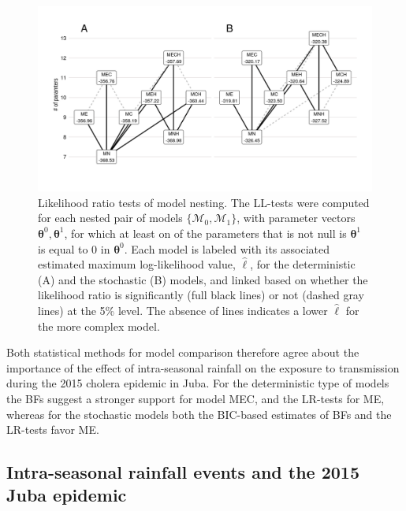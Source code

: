 \begin{figure}
    \centering
    \includegraphics[width = \textwidth, trim = 11mm 19mm 10mm 12mm, clip]{fig_cholera-rainfall/Lemaitre_ACTROP_2018_42_R1_fig3.png}
    \caption[Likelihood ratio tests of model nesting]{Likelihood ratio tests of model nesting. The LL-tests were computed for each nested pair of models $\{\mathcal{M}_0, \mathcal{M}_1\}$, with parameter vectors $\boldsymbol{\theta}^0,\boldsymbol{\theta}^1$, for which at least on of the parameters that is not null is $\boldsymbol{\theta}^1$ is equal to 0 in $\boldsymbol{\theta}^0$. Each model is labeled with its associated estimated maximum log-likelihood value, $\hat{\ell}$, for the deterministic (A) and the stochastic (B) models, and linked based on whether the likelihood ratio is significantly (full black lines) or not (dashed gray lines) at the 5\% level. The absence of lines indicates a lower $\hat{\ell}$ for the more complex model.} 
    \label{fig:lltests}
\end{figure}

Both statistical methods for model comparison therefore agree about the importance of the effect of intra-seasonal rainfall on the exposure to transmission during the 2015 cholera epidemic in Juba. For the deterministic type of models the BFs suggest a stronger support for model \textsc{MEC}, and the LR-tests for \textsc{ME}, whereas for the stochastic models both the BIC-based estimates of BFs and the LR-tests favor \textsc{ME}. 

\subsection{Intra-seasonal rainfall events and the 2015 Juba epidemic}

